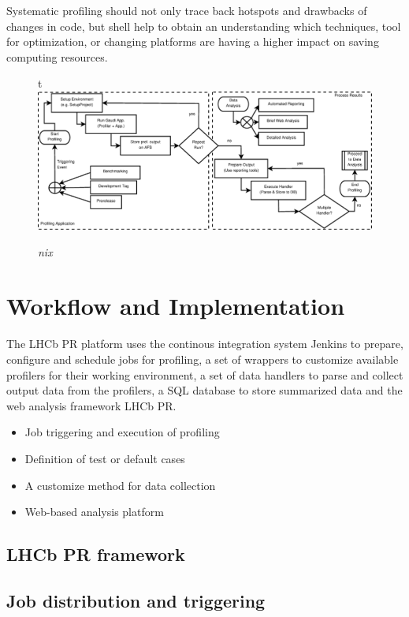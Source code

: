 \documentclass[a4paper]{jpconf}
\begin{document}
Systematic profiling should not only trace back hotspots and drawbacks of changes in code, but shell help to obtain an understanding which techniques, tool for optimization, or changing platforms are having a higher impact on saving computing resources.

\newpage

\begin{figure}{t}
\includegraphics[scale=0.3]{figures/profiling_process.eps}
\caption{\small \textit{nix}}
\label{fig:trend}
\end{figure}

\section{Workflow and Implementation}
\label{sec:workflow_and_implementation}

The LHCb PR platform uses the continous integration system Jenkins \cite{jenkins} to prepare, configure and schedule jobs for profiling, a set of wrappers to customize available profilers for their working environment, a set of data handlers to parse and collect output data from the profilers, a SQL database to store summarized data and the web analysis framework LHCb PR. 

\begin{itemize}
 \item Job triggering and execution of profiling
 \item Definition of test or default cases
 \item A customize method for data collection
 \item Web-based analysis platform
\end{itemize}

\subsection{LHCb PR framework}
\label{sec:lhcbpr_framework}

\subsection{Job distribution and triggering}
\label{sec:job_distribution}
\end{document}
